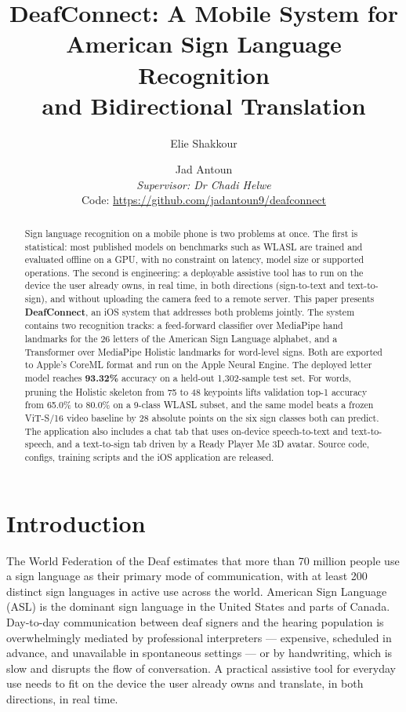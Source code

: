 \documentclass[11pt]{article}
\title{DeafConnect: A Mobile System for American Sign Language Recognition\\and Bidirectional Translation}
\author{Elie Shakkour \and Jad Antoun \\
  \textit{Supervisor: Dr Chadi Helwe} \\[0.3em]
  \small Code: \url{https://github.com/jadantoun9/deafconnect} \\}
\begin{document}
\maketitle

\begin{abstract}
Sign language recognition on a mobile phone is two problems at once. The first is statistical: most published models on benchmarks such as WLASL are trained and evaluated offline on a GPU, with no constraint on latency, model size or supported operations. The second is engineering: a deployable assistive tool has to run on the device the user already owns, in real time, in both directions (sign-to-text and text-to-sign), and without uploading the camera feed to a remote server. This paper presents \textbf{DeafConnect}, an iOS system that addresses both problems jointly. The system contains two recognition tracks: a feed-forward classifier over MediaPipe hand landmarks for the 26 letters of the American Sign Language alphabet, and a Transformer over MediaPipe Holistic landmarks for word-level signs. Both are exported to Apple's CoreML format and run on the Apple Neural Engine. The deployed letter model reaches \textbf{93.32\%} accuracy on a held-out 1{,}302-sample test set. For words, pruning the Holistic skeleton from 75 to 48 keypoints lifts validation top-1 accuracy from 65.0\% to 80.0\% on a 9-class WLASL subset, and the same model beats a frozen ViT-S/16 video baseline by 28 absolute points on the six sign classes both can predict. The application also includes a chat tab that uses on-device speech-to-text and text-to-speech, and a text-to-sign tab driven by a Ready Player Me 3D avatar. Source code, configs, training scripts and the iOS application are released.
\end{abstract}

\section{Introduction}

The World Federation of the Deaf estimates that more than 70 million people use a sign language as their primary mode of communication, with at least 200 distinct sign languages in active use across the world. American Sign Language (ASL) is the dominant sign language in the United States and parts of Canada. Day-to-day communication between deaf signers and the hearing population is overwhelmingly mediated by professional interpreters --- expensive, scheduled in advance, and unavailable in spontaneous settings --- or by handwriting, which is slow and disrupts the flow of conversation. A practical assistive tool for everyday use needs to fit on the device the user already owns and translate, in both directions, in real time.
\end{document}
